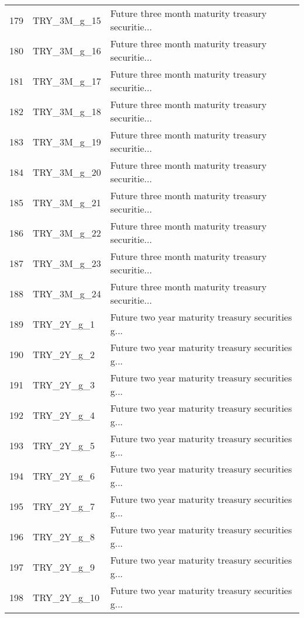 \begin{tabular}{lll}
179 &                TRY\_3M\_g\_15 &  Future three month maturity treasury securitie... \\
180 &                TRY\_3M\_g\_16 &  Future three month maturity treasury securitie... \\
181 &                TRY\_3M\_g\_17 &  Future three month maturity treasury securitie... \\
182 &                TRY\_3M\_g\_18 &  Future three month maturity treasury securitie... \\
183 &                TRY\_3M\_g\_19 &  Future three month maturity treasury securitie... \\
184 &                TRY\_3M\_g\_20 &  Future three month maturity treasury securitie... \\
185 &                TRY\_3M\_g\_21 &  Future three month maturity treasury securitie... \\
186 &                TRY\_3M\_g\_22 &  Future three month maturity treasury securitie... \\
187 &                TRY\_3M\_g\_23 &  Future three month maturity treasury securitie... \\
188 &                TRY\_3M\_g\_24 &  Future three month maturity treasury securitie... \\
189 &                 TRY\_2Y\_g\_1 &  Future two year maturity treasury securities g... \\
190 &                 TRY\_2Y\_g\_2 &  Future two year maturity treasury securities g... \\
191 &                 TRY\_2Y\_g\_3 &  Future two year maturity treasury securities g... \\
192 &                 TRY\_2Y\_g\_4 &  Future two year maturity treasury securities g... \\
193 &                 TRY\_2Y\_g\_5 &  Future two year maturity treasury securities g... \\
194 &                 TRY\_2Y\_g\_6 &  Future two year maturity treasury securities g... \\
195 &                 TRY\_2Y\_g\_7 &  Future two year maturity treasury securities g... \\
196 &                 TRY\_2Y\_g\_8 &  Future two year maturity treasury securities g... \\
197 &                 TRY\_2Y\_g\_9 &  Future two year maturity treasury securities g... \\
198 &                TRY\_2Y\_g\_10 &  Future two year maturity treasury securities g... \\

\end{tabular}
